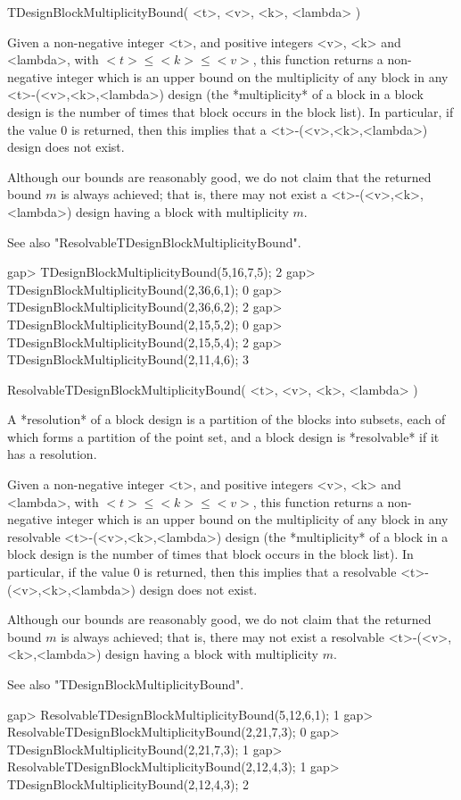 \>TDesignBlockMultiplicityBound( <t>, <v>, <k>, <lambda> )

Given a non-negative integer <t>, and positive integers <v>, <k> and
<lambda>, with $<t>\le <k>\le <v>$, this function returns a non-negative
integer which is an upper bound on the multiplicity of any block in
any <t>-(<v>,<k>,<lambda>) design (the *multiplicity* of a block in
a block design is the number of times that block occurs in the block
list). In particular, if the value $0$ is returned, then this implies
that a <t>-(<v>,<k>,<lambda>) design does not exist.

Although our bounds are reasonably good, we do not claim that the
returned bound $m$ is always achieved; that is, there may not exist a
<t>-(<v>,<k>,<lambda>) design having a block with multiplicity $m$.

See also "ResolvableTDesignBlockMultiplicityBound".

\beginexample
gap> TDesignBlockMultiplicityBound(5,16,7,5);
2
gap> TDesignBlockMultiplicityBound(2,36,6,1);
0
gap> TDesignBlockMultiplicityBound(2,36,6,2);
2
gap> TDesignBlockMultiplicityBound(2,15,5,2);
0
gap> TDesignBlockMultiplicityBound(2,15,5,4);
2
gap> TDesignBlockMultiplicityBound(2,11,4,6);
3
\endexample



\>ResolvableTDesignBlockMultiplicityBound( <t>, <v>, <k>, <lambda> )
 
A *resolution* of a block design is a partition of the blocks into
subsets, each of which forms a partition of the point set, and a block
design is *resolvable* if it has a resolution.

Given a non-negative integer <t>, and positive integers <v>, <k> and
<lambda>, with $<t>\le <k>\le <v>$, this function returns a non-negative
integer which is an upper bound on the multiplicity of any block in any
resolvable <t>-(<v>,<k>,<lambda>) design (the *multiplicity* of a block
in a block design is the number of times that block occurs in the block
list). In particular, if the value $0$ is returned, then this implies
that a resolvable <t>-(<v>,<k>,<lambda>) design does not exist.

Although our bounds are reasonably good, we do not claim that the returned
bound $m$ is always achieved; that is, there may not exist a resolvable
<t>-(<v>,<k>,<lambda>) design having a block with multiplicity $m$.

See also "TDesignBlockMultiplicityBound".

\beginexample
gap> ResolvableTDesignBlockMultiplicityBound(5,12,6,1);
1
gap> ResolvableTDesignBlockMultiplicityBound(2,21,7,3);
0
gap> TDesignBlockMultiplicityBound(2,21,7,3);          
1
gap> ResolvableTDesignBlockMultiplicityBound(2,12,4,3);
1
gap> TDesignBlockMultiplicityBound(2,12,4,3);          
2
\endexample


